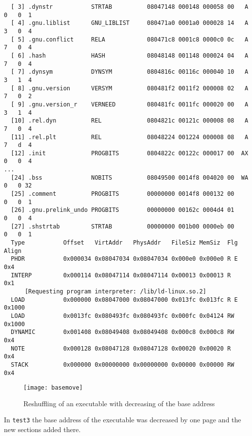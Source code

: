 \documentclass[twoside]{article}
\def\tts#1{\texttt{\small #1}}
\begin{document}
{{\begin{verbatim}
  [ 3] .dynstr           STRTAB          08047148 000148 000058 00   A  0   0  1
  [ 4] .gnu.liblist      GNU_LIBLIST     080471a0 0001a0 000028 14   A  3   0  4
  [ 5] .gnu.conflict     RELA            080471c8 0001c8 0000c0 0c   A  7   0  4
  [ 6] .hash             HASH            08048148 001148 000024 04   A  7   0  4
  [ 7] .dynsym           DYNSYM          0804816c 00116c 000040 10   A  3   1  4
  [ 8] .gnu.version      VERSYM          080481f2 0011f2 000008 02   A  7   0  2
  [ 9] .gnu.version_r    VERNEED         080481fc 0011fc 000020 00   A  3   1  4
  [10] .rel.dyn          REL             0804821c 00121c 000008 08   A  7   0  4
  [11] .rel.plt          REL             08048224 001224 000008 08   A  7   d  4
  [12] .init             PROGBITS        0804822c 00122c 000017 00  AX  0   0  4
...
  [24] .bss              NOBITS          08049500 0014f8 004020 00  WA  0   0 32
  [25] .comment          PROGBITS        00000000 0014f8 000132 00      0   0  1
  [26] .gnu.prelink_undo PROGBITS        00000000 00162c 0004d4 01      0   0  4
  [27] .shstrtab         STRTAB          00000000 001b00 0000eb 00      0   0  1
  Type           Offset   VirtAddr   PhysAddr   FileSiz MemSiz  Flg Align
  PHDR           0x000034 0x08047034 0x08047034 0x000e0 0x000e0 R E 0x4
  INTERP         0x000114 0x08047114 0x08047114 0x00013 0x00013 R   0x1
      [Requesting program interpreter: /lib/ld-linux.so.2]
  LOAD           0x000000 0x08047000 0x08047000 0x013fc 0x013fc R E 0x1000
  LOAD           0x0013fc 0x080493fc 0x080493fc 0x000fc 0x04124 RW  0x1000
  DYNAMIC        0x001408 0x08049408 0x08049408 0x000c8 0x000c8 RW  0x4
  NOTE           0x000128 0x08047128 0x08047128 0x00020 0x00020 R   0x4
  STACK          0x000000 0x00000000 0x00000000 0x00000 0x00000 RW  0x4
\end{verbatim}}
}

\begin{figure}[!ht]
\centering
\texttt{[image: basemove]}
\caption{Reshuffling of an executable with decreasing of the base address}
\end{figure}

In \tts{test3} the base address of the executable was decreased by one page and
the new sections added there.
\end{document}
